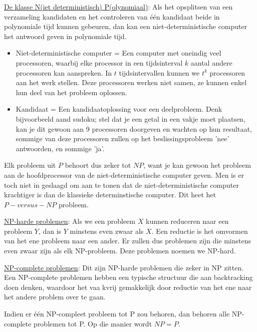 \documentclass{report}
\begin{document}
\underline{De klasse N(iet deterministisch) P(olynomiaal)}: Als het opsplitsen van een verzameling kandidaten en het controleren van één kandidaat beide in polynomiale tijd kunnen gebeuren, dan kan een niet-deterministische computer het antwoord geven in polynomiale tijd.
\begin{itemize}
	\item Niet-deterministische computer = Een computer met oneindig veel processoren, waarbij elke processor in een tijdsinterval $k$ aantal andere processoren kan aanspreken. In $t$ tijdsintervallen kunnen we $t^k$ processoren aan het werk stellen. Deze processoren werken niet samen, ze kunnen enkel hun deel van het probleem oplossen.
	\item Kandidaat = Een kandidaatoplossing voor een deelprobleem. Denk bijvoorbeeld aand sudoku; stel dat je een getal in een vakje moet plaatsen, kan je dit gewoon aan 9 processoren doorgeven en wachten op hun resultaat, sommige van deze processoren zullen op het beslissingsprobleem 'nee' antwoorden, en sommige 'ja'.
\end{itemize}

Elk probleem uit $P$ behoort dus zeker tot $NP$, want je kan gewoon het probleem aan de hoofdprocessor van de niet-deterministische computer geven. Men is er toch niet in geslaagd om aan te tonen dat de niet-deterministische computer krachtiger is dan de klassieke determinstische computer. Dit heet het $P-versus-NP$ probleem.

\underline{NP-harde problemen}: Als we een probleem $X$ kunnen reduceren naar een probleem $Y$, dan is $Y$ minstens even zwaar als $X$. Een reductie is het omvormen van het ene probleem naar een ander. Er zullen dus problemen zijn die minstens even zwaar zijn als elk NP-probleem. Deze problemen noemen we NP-hard.

\underline{NP-complete problemen}: Dit zijn NP-harde problemen die zeker in NP zitten. Een NP-complete problemen hebben een typische structuur die aan backtracking doen denken, waardoor het vaa kvrij gemakkelijk door reductie van het ene naar het andere problem over te gaan.

Indien er één NP-compleet probleem tot P zou behoren, dan behoren alle NP-complete problemen tot P. Op die manier wordt $NP = P$.
\end{document}
